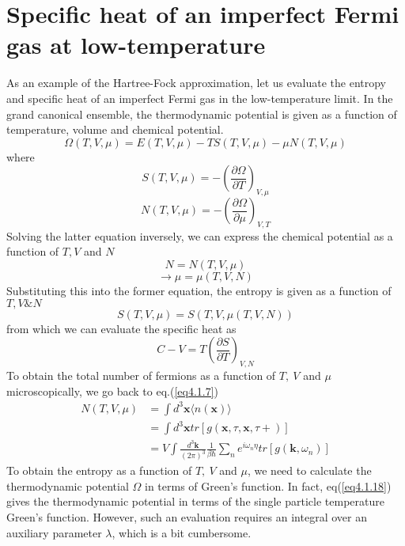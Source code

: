 \section{Specific heat of an imperfect Fermi gas at low-temperature}
%
As an example of the Hartree-Fock approximation, let us evaluate the entropy and specific heat of an imperfect Fermi gas in the low-temperature limit.
In the grand canonical ensemble, the thermodynamic potential is given as a function of temperature, volume and chemical potential.
\begin{equation}
\Omega(T,V,\mu)=E(T,V,\mu)-TS(T,V,\mu)-\mu N(T,V,\mu)
\end{equation}
where
\begin{equation}\label{eq4.6.2}
S(T,V,\mu)=-\left( \frac{\partial\Omega}{\partial T}\right)_{V,\mu}
\end{equation}
\begin{equation}
N(T,V,\mu)=-\left( \frac{\partial\Omega}{\partial \mu}\right)_{V,T}
\end{equation}
Solving the latter equation inversely, we can express the chemical potential as a function of $T,V$ and $N$
\[
N=N(T,V,\mu)
\]
\[
\rightarrow \mu=\mu(T,V,N)
\]
Substituting this into the former equation, the entropy is given as a function of $T,V \& N$
\[
S(T,V,\mu)=S(T,V,\mu(T,V,N))
\]
from which we can evaluate the specific heat as 
\begin{equation}
C-V=T\left(\frac{\partial S}{\partial T}\right)_{V,N}
\end{equation}
To obtain the total number of fermions as a function of $T,\ V$ and $\mu$ microscopically, we go back to eq.(\ref{eq4.1.7})
\begin{equation}\label{eq4.6.5}
\begin{aligned}
N(T,V,\mu)&=\int d^3 \mathbf{x} \langle n(\mathbf{x})\rangle\\
&=\int d^3 \mathbf{x} tr[g(\mathbf{x},\tau,\mathbf{x},\tau+)]\\
&=V\int \frac{d^3\mathbf{k}}{(2\pi)^3} \frac{1}{\beta\hbar}\sum_n e^{i\omega_n\eta} tr[g(\mathbf{k},\omega_n)]
\end{aligned}
\end{equation}
To obtain the entropy as a function of $T,\ V$ and $\mu$, we need to calculate the thermodynamic potential $\Omega$ in terms of Green's function.
In fact, eq(\ref{eq4.1.18}) gives the thermodynamic potential in terms of the single particle temperature Green's function.
However, such an evaluation requires an integral over an auxiliary parameter $\lambda$, which is a bit cumbersome.
